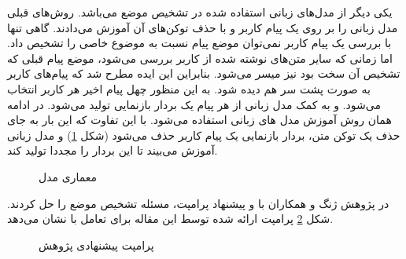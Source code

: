 یکی دیگر از مدل‌های زبانی استفاده شده در تشخیص موضع 
\cite{matero-etal-2021-melt-message}
می‌باشد. روش‌های قبلی مدل زبانی را بر روی یک پیام کاربر و با حذف توکن‌های آن آموزش می‌دادند. گاهی تنها با بررسی یک پیام کاربر نمی‌توان موضع پیام نسبت به موضوع خاصی را تشخیص داد. اما زمانی که سایر متن‌های نوشته شده از کاربر بررسی می‌شود، موضع پیام قبلی که تشخیص آن سخت بود نیز میسر می‌شود. بنابراین این ایده مطرح شد که پیام‌های کاربر به صورت پشت سر هم دیده شود. به این منظور چهل پیام اخیر هر کاربر انتخاب می‌شود. و به کمک مدل زبانی از هر پیام یک بردار بازنمایی تولید می‌شود. در ادامه همان روش آموزش مدل های زبانی استفاده می‌شود. با این تفاوت که این بار به جای حذف یک توکن متن، بردار بازنمایی یک پیام کاربر
حذف می‌شود (شکل
\ref{MeLT})
و مدل زبانی آموزش می‌بیند تا این بردار را مجددا تولید کند.
\begin{figure}[H]
	\caption[معماری مدل
	]{معماری مدل
		\cite{matero-etal-2021-melt-message}}
	\label{MeLT}
\end{figure}

در پژوهش 
\cite{zhang2022would}
ژنگ و همکاران با 
و پیشنهاد پرامپت، مسئله تشخیص موضع را حل کردند. شکل
\ref{GPT_Stance}
پرامپت ارائه شده توسط این مقاله برای تعامل با 
نشان می‌دهد.
\begin{figure}[H]
	
	\caption[معماری مدل
	]{پرامپت پیشنهادی پژوهش
		\cite{zhang2022would}}
	\label{GPT_Stance}
\end{figure}


	

